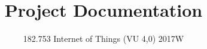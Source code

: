\documentclass[a4paper,10pt,egregdoesnotlikesansseriftitles]{scrartcl}
\title{Project Documentation}
\subtitle{182.753 Internet of Things (VU 4,0) 2017W}
\author{\texorpdfstring{%
  Philipp Raich\thanks{~\href{mailto:philipp.raich@tuwien.ac.at}{philipp.raich@tuwien.ac.at}} \and
  Mino Sharkhawy\thanks{~\href{mailto:mino.sharkhawy@student.tuwien.ac.at}{mino.sharkhawy@student.tuwien.ac.at}} \and
  Thomas Weber\thanks{~\href{mailto:thomas.weber@student.tuwien.ac.at}{e1025654@student.tuwien.ac.at}}
  }%
  {Philipp Raich, Mino Sharkhawy, Thomas Weber}%
}
\begin{document}
\begin{singlespacing}
\maketitle
%

\setcounter{tocdepth}{2}

\tableofcontents
\end{singlespacing}

\thispagestyle{empty}


%

% 
\end{document}
